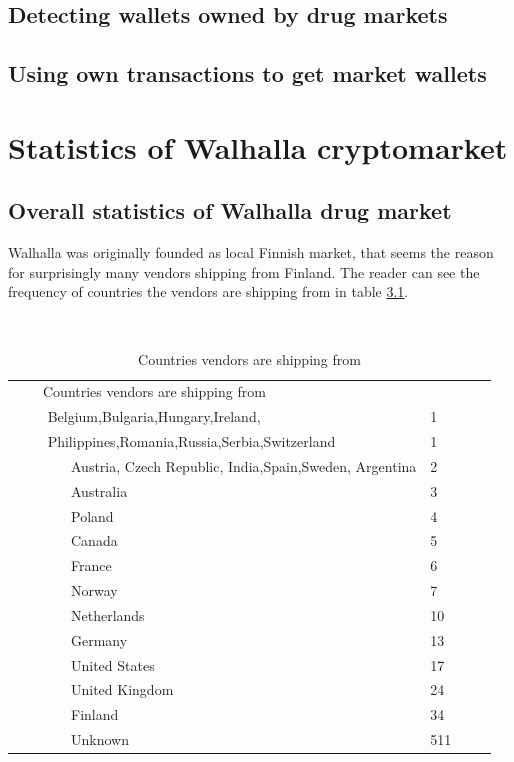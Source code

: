 \documentclass[
  digital, %
  table,   %
  lof,     %
  lot,     %
  oneside
]{fithesis3}
\begin{document}
\section{Detecting wallets owned by drug markets}
\section{Using own transactions to get market wallets}

\chapter{Statistics of Walhalla cryptomarket}



\section{Overall statistics of Walhalla drug market}

Walhalla was originally founded as local Finnish market,
that seems the reason for surprisingly many vendors shipping from Finland.
The reader can see the frequency of countries the vendors are shipping from in table \ref{shipcount}.

\begin{table}
    \caption{Countries vendors are shipping from}
    \label{shipcount}
    \begin{tabular}{|l|l|}
    Countries vendors are shipping from\\
      Belgium,Bulgaria,Hungary,Ireland, & 1\\
      Philippines,Romania,Russia,Serbia,Switzerland& 1   \\
        Austria, Czech Republic, India,Spain,Sweden, Argentina  & 2   \\
        Australia                                    & 3   \\ 
        Poland                                       & 4   \\ 
        Canada                                       & 5   \\ 
        France                                       & 6   \\ 
        Norway                                       & 7   \\ 
        Netherlands                                  & 10  \\ 
        Germany                                      & 13  \\ 
        United States                                & 17  \\ 
        United Kingdom                               & 24  \\ 
        Finland                                      & 34  \\ 
        Unknown                                      & 511  
    \end{tabular}
\end{table}
\end{document}
